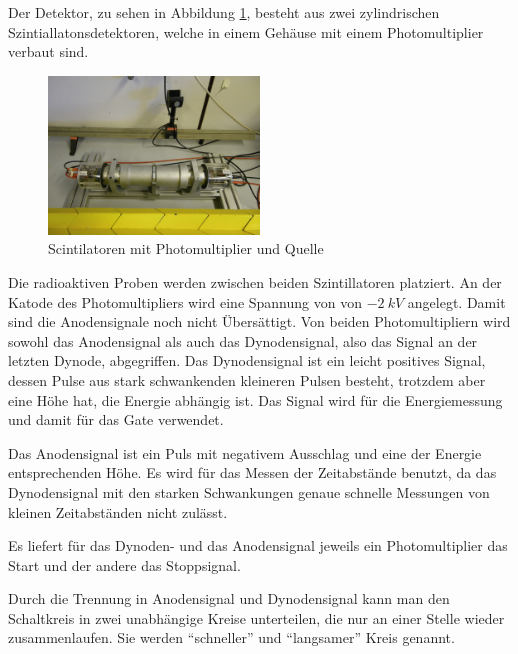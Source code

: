 \documentclass[a4paper,12pt]{article}
\begin{document}
Der Detektor, zu sehen in Abbildung \ref{fig:quelle},  besteht aus zwei zylindrischen Szintiallatonsdetektoren,
 welche in einem Gehäuse mit einem Photomultiplier verbaut sind.
\begin{figure}[htb]
		\centering
		\includegraphics[width=0.5\textwidth]{quelle2.jpg}
		\caption{Scintilatoren mit Photomultiplier und Quelle}
		\label{fig:quelle}
\end{figure}

Die radioaktiven Proben werden zwischen beiden Szintillatoren platziert.
An der Katode des Photomultipliers wird  eine Spannung von von $\SI{-2}{kV}$ angelegt.
Damit sind die Anodensignale noch nicht Übersättigt.
Von beiden Photomultipliern wird sowohl das Anodensignal als auch das Dynodensignal, also das Signal an der letzten Dynode, abgegriffen.
Das Dynodensignal ist ein leicht positives Signal, dessen Pulse aus stark schwankenden kleineren Pulsen besteht, trotzdem aber eine Höhe hat, die Energie abhängig ist.
Das Signal wird für die Energiemessung und damit für das Gate verwendet.

Das Anodensignal ist ein Puls mit negativem Ausschlag und eine der Energie entsprechenden Höhe.
Es wird für das Messen der Zeitabstände benutzt, da das Dynodensignal mit den starken Schwankungen genaue schnelle Messungen von kleinen Zeitabständen nicht zulässt.

Es liefert für das Dynoden- und das Anodensignal jeweils ein Photomultiplier das Start und der andere das Stoppsignal.

Durch die Trennung in Anodensignal und Dynodensignal kann man den Schaltkreis in zwei unabhängige Kreise unterteilen, die nur an einer Stelle wieder zusammenlaufen.
Sie werden "`schneller"' und "`langsamer"' Kreis genannt.
\end{document}
